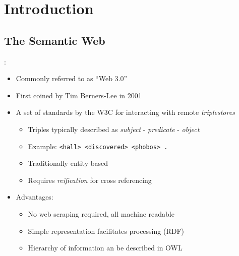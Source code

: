 \documentclass[logoontitle,tabu,supertabular,aspectratio=43]{preney-uwindsor-beamer}
\begin{document}

	\section{Introduction}

\subsection{The Semantic Web}
\begin{frame}{\insertsection: \insertsubsection}
    \begin{itemize}
        \item Commonly referred to as ``Web 3.0''
        \item First coined by Tim Berners-Lee in 2001 \cite{berners2001semantic}
        \item A set of standards by the W3C for interacting with remote {\em triplestores} \cite{w3csemanticweb}
        \begin{itemize}
            \item Triples typically described as {\em subject} - {\em predicate} - {\em object}
            \item Example: \texttt{<hall> <discovered> <phobos> .}
            \item Traditionally entity based %
            \item Requires {\em reification} for cross referencing
        \end{itemize}
        \item Advantages:
        \begin{itemize}
            \item No web scraping required, all machine readable
            \item Simple representation facilitates processing (RDF) \cite{w3c}
            \item Hierarchy of information an be described in OWL \cite{mcguinness2004owl}
        \end{itemize}
    \end{itemize}
\end{frame}

\end{document}
